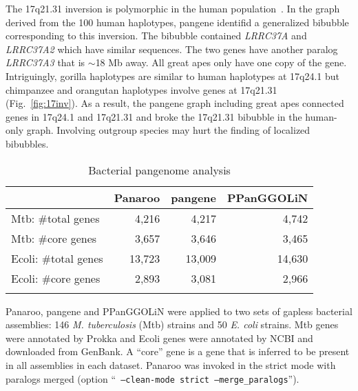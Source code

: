 \documentclass[webpdf,contemporary,large,namedate]{oup-authoring-template}%
\begin{document}
The 17q21.31 inversion is polymorphic in the human population~\citep{Boettger:2012aa,Steinberg:2012aa}.
In the graph derived from the 100 human haplotypes, pangene identifid a generalized bibubble corresponding to this inversion.
The bibubble contained \emph{LRRC37A} and \emph{LRRC37A2} which have similar sequences.
The two genes have another paralog \emph{LRRC37A3} that is $\sim$18 Mb away.
All great apes only have one copy of the gene.
Intriguingly, gorilla haplotypes are similar to human haplotypes at 17q24.1
but chimpanzee and orangutan haplotypes involve genes at 17q21.31 (Fig.~\ref{fig:17inv}).
As a result, the pangene graph including great apes connected genes in 17q24.1 and 17q21.31
and broke the 17q21.31 bibubble in the human-only graph.
Involving outgroup species may hurt the finding of localized bibubbles.

\begin{table}[!tb]
\caption{Bacterial pangenome analysis\label{tab:bac}}
\begin{tabular*}{\columnwidth}{@{\extracolsep\fill}lrrr@{\extracolsep\fill}}
\toprule
& Panaroo & pangene & PPanGGOLiN\\
\midrule
Mtb: \#total genes   & 4,216  & 4,217  & 4,742  \\
Mtb: \#core genes    & 3,657  & 3,646  & 3,465  \\
Ecoli: \#total genes & 13,723 & 13,009 & 14,630 \\
Ecoli: \#core genes  & 2,893  & 3,081  & 2,966  \\
\botrule
\end{tabular*}
\begin{tablenotes}
\item Panaroo, pangene and PPanGGOLiN were applied to two sets of gapless bacterial assemblies:
146 \emph{M. tuberculosis} (Mtb) strains and 50 \emph{E. coli} strains.
Mtb genes were annotated by Prokka and Ecoli genes were annotated by NCBI and downloaded from GenBank.
A ``core'' gene is a gene that is inferred to be present in all assemblies in each dataset.
Panaroo was invoked in the strict mode with paralogs merged (option ``{\tt
--clean-mode strict --merge\_paralogs}'').
\end{tablenotes}
\end{table}
\end{document}

